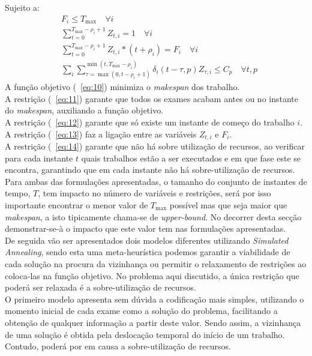 Sujeito a:
\begin{align}
&F_{i} \leq T_{\max} \quad \forall i \label{eq:11} \\
&\sum^{T_{\max}-\rho_{i}+1}_{t=0}Z_{t,i} = 1 \quad \forall i \label{eq:12} \\
&\sum^{T_{\max}-\rho_{i}+1}_{t=0}Z_{t,i}*(t+\rho_{i}) = F_{i} \quad \forall i \label{eq:13} \\
&\sum_{i}\sum^{\min(t, T_{\max}-\rho_{i})}_{\tau=\max(0, t-\rho_{i}+1)}\delta_{i}(t-\tau,p)Z_{\tau,i} \leq C_{p} \quad \forall t,p \label{eq:14}
\end{align}
A função objetivo (~\ref{eq:10}) minimiza o \textit{makespan} dos trabalho.\\
A restrição (~\ref{eq:11}) garante que todos os exames acabam antes ou no instante do \textit{makespan}, auxiliando a função objetivo.\\
A restrição (~\ref{eq:12}) garante que só existe um instante de começo do trabalho $i$.\\
A restrição (~\ref{eq:13}) faz a ligação entre as variáveis $Z_{t,i}$ e $F_{i}$.\\
A restrição (~\ref{eq:14}) garante que não há sobre utilização de recursos, ao verificar para cada instante $t$ quais trabalhos estão a ser executados e em que fase este se encontra, garantindo que em cada instante não há sobre-utilização de recursos.\\

Para ambas das formulações apresentadas, o tamanho do conjunto de instantes de tempo, $T$, tem impacto no número de variáveis e restrições, será por isso importante encontrar o menor valor de $T_{\max}$ possível mas que seja maior que \textit{makespan}, a isto tipicamente chama-se de \textit{upper-bound}. No decorrer desta secção demonstrar-se-à o impacto que este valor tem nas formulações apresentadas.\\ 

De seguida vão ser apresentados dois modelos diferentes utilizando \textit{Simulated Annealing}, sendo esta uma meta-heurística podemos garantir a viabilidade de cada solução na procura da vizinhança ou permitir o relaxamento de restrições ao coloca-las na função objetivo. No problema aqui discutido, a única restrição que poderá ser relaxada é a sobre-utilização de recursos.\\

O primeiro modelo apresenta sem dúvida a codificação mais simples, utilizando o momento inicial de cada exame como a solução do problema, facilitando a obtenção de qualquer informação a partir deste valor. Sendo assim, a vizinhança de uma solução é obtida pela deslocação temporal do início de um trabalho. Contudo, poderá por em causa a sobre-utilização de recursos.\\

